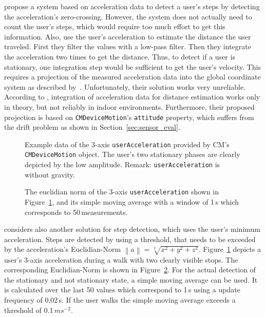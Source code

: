 \citet{wang:wlan} propose a system based on acceleration data to detect a user's steps by detecting the acceleration's zero-crossing. However, the system does not actually need to count the user's steps, which would require too much effort to get this information. Also, \citet{shanklin:embedded_sensors} use the user's acceleration to estimate the distance the user traveled. First they filter the values with a low-pass filter. Then they integrate the acceleration two times to get the distance. Thus, to detect if a user is stationary, one integration step would be sufficient to get the user's velocity. This requires a projection of the measured acceleration data into the global coordinate system as described by~\citet{shanklin:embedded_sensors}. Unfortunately, their solution works very unreliable. According to \citet{wang:wlan}, integration of acceleration data for distance estimation works only in theory, but not reliably in indoor environments. Furthermore, their proposed projection is based on \texttt{CMDeviceMotion}'s \texttt{attitude} property, which suffers from the drift problem as shown in Section~\ref{sec:sensor_eval}.

\begin{figure}[p]
	
	\caption{Example data of the 3-axis \texttt{userAcceleration} provided by \acs{CM}'s \texttt{CMDeviceMotion} object. The user's two stationary phases are clearly depicted by the low amplitude. Remark: \texttt{userAcceleration} is without gravity.}
	\label{fig:mm_stationary_1}
\end{figure}

\begin{figure}[p]
	
	\caption{The euclidian norm of the 3-axis \texttt{userAcceleration} shown in Figure~\ref{fig:mm_stationary_1}, and its simple moving average with a window of 1\,s which corresponds to 50\,measurements.}
	\label{fig:mm_stationary_2}
\end{figure}

\citet{shanklin:embedded_sensors} considers also another solution for step detection, which uses the user's minimum acceleration. Steps are detected by using a threshold, that needs to be exceeded by the acceleration's Euclidian-Norm $\left\lVert a \right\rVert = \sqrt[2]{x^{2}+y^{2}+z^{2}}$. Figure~\ref{fig:mm_stationary_1} depicts a user's 3-axis acceleration during a walk with two clearly visible stops. The corresponding Euclidian-Norm is shown in Figure~\ref{fig:mm_stationary_2}. For the actual detection of the stationary and not stationary state, a simple moving average can be used. It is calculated over the last 50 values which correspond to 1\,s using a update frequency of 0,02\,s. If the user walks the simple moving average exceeds a threshold of 0.1\,$ms^{-2}$.

